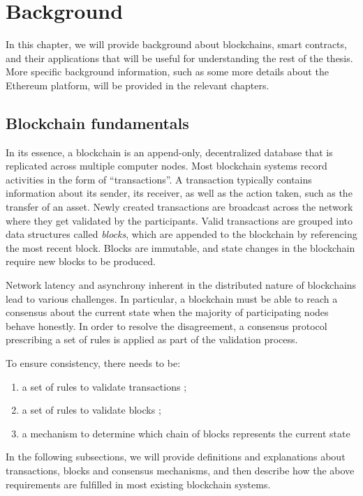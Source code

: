 \chapter{Background}
\label{ch:background}

In this chapter, we will provide background about blockchains, smart contracts, and their applications that will be useful for understanding the rest of the thesis.
More specific background information, such as some more details about the Ethereum platform, will be provided in the relevant chapters.

\section{Blockchain fundamentals}
In its essence, a blockchain is an append-only, decentralized database that is replicated across multiple computer nodes.
Most blockchain systems record activities in the form of ``transactions''.
A transaction typically contains information about its sender, its receiver, as well as the action taken, such as the transfer of an asset.
Newly created transactions are broadcast across the network where they get validated by the participants.
Valid transactions are grouped into data structures called \textit{blocks}, which are appended to the blockchain by referencing the most recent block.
Blocks are immutable, and state changes in the blockchain require new blocks to be produced.

Network latency and asynchrony inherent in the distributed nature of blockchains lead to various challenges.
In particular, a blockchain must be able to reach a consensus about the current state when the majority of participating nodes behave honestly.
In order to resolve the disagreement, a consensus protocol prescribing a set of rules is applied as part of the validation process.

To ensure consistency, there needs to be:

\begin{enumerate}\itemsep=-1pt
	\item a set of rules to validate transactions \label{req1};
	\item a set of rules to validate blocks \label{req2};
	\item a mechanism to determine which chain of blocks represents the current state \label{req3}
\end{enumerate}

%
In the following subsections, we will provide definitions and explanations about transactions, blocks and consensus mechanisms, and then describe how the above requirements are fulfilled in most existing blockchain systems.

